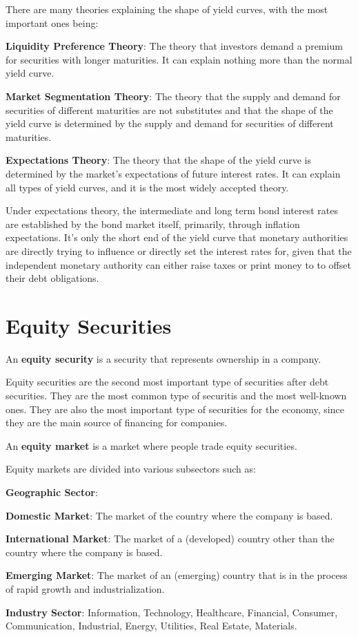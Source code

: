 
There are many theories explaining the shape of yield curves, with the most important ones being:
\bit
\item \textbf{Liquidity Preference Theory}: The theory that investors demand a premium for securities with longer
maturities. It can explain nothing more than the normal yield curve.
\item \textbf{Market Segmentation Theory}: The theory that the supply and demand for securities of different maturities
are not substitutes and that the shape of the yield curve is determined by the supply and demand for securities of
different maturities.
\item \textbf{Expectations Theory}: The theory that the shape of the yield curve is determined by the market's
expectations of future interest rates. It can explain all types of yield curves, and it is the most widely accepted
theory.
\eit

Under expectations theory, the intermediate and long term bond interest rates are established by the bond market
itself, primarily, through inflation expectations. It's only the short end of the yield curve that monetary authorities
are directly trying to influence or directly set the interest rates for, given that the independent monetary authority
can either raise taxes or print money to to offset their debt obligations.


\newpage

\section{Equity Securities}

An \textbf{equity security} is a security that represents ownership in a company.
\ed

Equity securities are the second most important type of securities after debt securities. They are the most common 
type of securitis and the most well-known ones. They are also the most important type of securities for the economy,
since they are the main source of financing for companies.

An \textbf{equity market} is a market where people trade equity securities.
\ed

Equity markets are divided into various subsectors such as:
\bit
\item \textbf{Geographic Sector}:
\bit
\item \textbf{Domestic Market}: The market of the country where the company is based.
\item \textbf{International Market}: The market of a (developed) country other than the country where the company is 
based.
\item \textbf{Emerging Market}: The market of an (emerging) country that is in the process of rapid growth and 
industrialization.
\eit
\item \textbf{Industry Sector}: Information, Technology, Healthcare, Financial, Consumer, Communication, Industrial,
Energy, Utilities, Real Estate, Materials.
\eit


